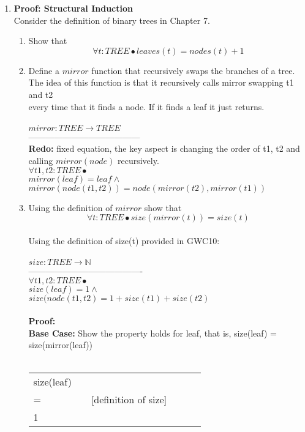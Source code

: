 \documentclass{article}
\begin{document}
\begin{enumerate}[\bf I.]
\item \textbf{Proof: Structural Induction} \\[8pt]
Consider the definition of binary trees in Chapter 7.
\begin{enumerate}
\item Show that
\[\forall t: TREE \bullet leaves(t) = nodes(t) + 1\]
\item Define a $mirror$ function that recursively swaps the branches of a tree. \\
  The idea of this function is that it recursively calls mirror swapping t1 and t2 \\
  every time that it finds a node. If it finds a leaf it just returns. \\
  \\
  $ mirror: TREE \rightarrow TREE $\\
  --------------------------------------- \\
  \textbf{Redo:} fixed equation, the key aspect is changing the order of t1, t2 and calling $mirror(node)$ recursively. \\
  $\forall t1,t2 : TREE \bullet$\\
  $mirror(leaf) = leaf \land$ \\
  $mirror(node(t1, t2)) = node(mirror(t2), mirror(t1))$ \\
\item Using the definition of $mirror$  show
that
\[\forall t: TREE \bullet size(mirror(t)) = size(t)\] \\
Using the definition of size(t) provided in GWC10: \\
\\
$ size: TREE \rightarrow \mathbb{N} $\\
---------------------------------------- \\
$ \forall t1,t2: TREE \bullet $\\
$ size (leaf) = 1 \land $\\
$ size (node(t1,t2) = 1 + size(t1) + size(t2) $ \\
\\
\textbf{Proof:}\\
\textbf{Base Case:} Show the property holds for leaf, that is, size(leaf) = size(mirror(leaf)) \\
\\
\begin{tabular}{l ll lll}
     size(leaf) &    &  \\
     = &   & [definition of size] \\
     1 & & \\

\end{tabular}
\end{enumerate}
\end{enumerate}
\end{document}
